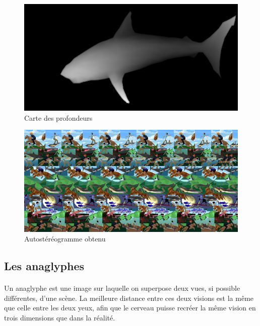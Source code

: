 \begin{figure}[h]
		\centering
		\includegraphics[scale=0.4]{carteProfondeur.png}
		\caption{\label{fig:carteProfondeur} Carte des profondeurs \protect \footnotemark }
\end{figure}
\begin{figure}[h]
		\centering
		\includegraphics[scale=0.5]{autostereog.png}
		\caption{\label{fig:autostereogramme} Autostéréogramme obtenu \protect \footnotemark }
\end{figure}

\subsection{Les anaglyphes}

\paragraph{}
	Un anaglyphe est une image sur laquelle on superpose deux vues, si possible différentes, d’une scène. La meilleure distance entre ces deux visions est la même que celle entre les deux yeux, afin que le cerveau puisse recréer la même vision en trois dimensions que dans la réalité.
	
